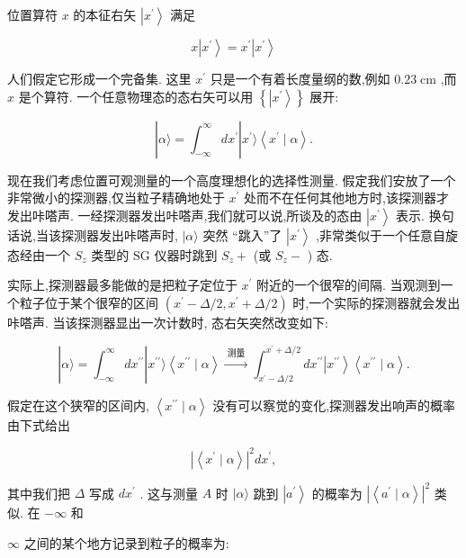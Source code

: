 \documentclass[lang=cn,newtx,10pt,scheme=chinese,thmcnt=section]{elegantbook}
\begin{document}
位置算符 $x$ 的本征右矢 $\left| {x}^{\prime }\right\rangle$ 满足

$$
x\left| {x}^{\prime }\right\rangle = {x}^{\prime }\left| {x}^{\prime }\right\rangle \tag{1.6.3}
$$

人们假定它形成一个完备集. 这里 ${x}^{\prime }$ 只是一个有着长度量纲的数,例如 ${0.23}\mathrm{\;{cm}}$ ,而 $x$ 是个算符. 一个任意物理态的态右矢可以用 $\left\{ \left| {x}^{\prime }\right\rangle \right\}$ 展开:

$$
\left| {\alpha \rangle = {\int }_{-\infty }^{\infty }d{x}^{\prime }}\right| {x}^{\prime }\rangle \left\langle {{x}^{\prime } \mid \alpha }\right\rangle . \tag{1.6.4}
$$

现在我们考虑位置可观测量的一个高度理想化的选择性测量. 假定我们安放了一个非常微小的探测器,仅当粒子精确地处于 ${x}^{\prime }$ 处而不在任何其他地方时,该探测器才发出咔嗒声. 一经探测器发出咔嗒声,我们就可以说,所谈及的态由 $\left| {x}^{\prime }\right\rangle$ 表示. 换句话说,当该探测器发出咔嗒声时, $|\alpha \rangle$ 突然 “跳入”了 $\left| {x}^{\prime }\right\rangle$ ,非常类似于一个任意自旋态经由一个 ${S}_{z}$ 类型的 $\mathrm{{SG}}$ 仪器时跳到 ${S}_{z} +$ (或 ${S}_{z} -$ ) 态.

实际上,探测器最多能做的是把粒子定位于 ${x}^{\prime }$ 附近的一个很窄的间隔. 当观测到一个粒子位于某个很窄的区间 $\left( {{x}^{\prime } - \Delta /2,{x}^{\prime } + \Delta /2}\right)$ 时,一个实际的探测器就会发出咔嗒声. 当该探测器显出一次计数时, 态右矢突然改变如下:

$$
\left| {\alpha \rangle = {\int }_{-\infty }^{\infty }d{x}^{\prime \prime }}\right| {x}^{\prime \prime }\rangle \left\langle {{x}^{\prime \prime } \mid \alpha }\right\rangle \overset{\text{ 测量 }}{ \rightarrow }{\int }_{{x}^{\prime } - \Delta /2}^{{x}^{\prime } + \Delta /2}d{x}^{\prime \prime }\left| {x}^{\prime \prime }\right\rangle \left\langle {{x}^{\prime \prime } \mid \alpha }\right\rangle . \tag{1. 6.5}
$$

假定在这个狭窄的区间内, $\left\langle {{x}^{\prime \prime } \mid \alpha }\right\rangle$ 没有可以察觉的变化,探测器发出响声的概率由下式给出

$$
{\left| \left\langle {x}^{\prime } \mid \alpha \right\rangle \right| }^{2}d{x}^{\prime }, \tag{1.6.6}
$$

其中我们把 $\Delta$ 写成 $d{x}^{\prime }$ . 这与测量 $A$ 时 $|\alpha \rangle$ 跳到 $\left| {a}^{\prime }\right\rangle$ 的概率为 ${\left| \left\langle {a}^{\prime } \mid \alpha \right\rangle \right| }^{2}$ 类似. 在 $- \infty$ 和

$\infty$ 之间的某个地方记录到粒子的概率为:
\end{document}
